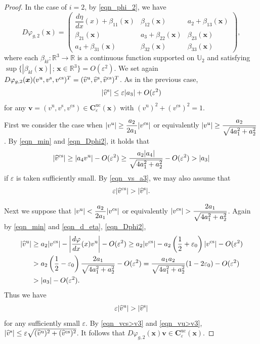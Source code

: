 \documentclass{amsart}
\theoremstyle{plain}
\theoremstyle{definition}
\theoremstyle{remark}
\numberwithin{equation}{section}
\def\bx{{\boldsymbol{x}}}
\def\bv{{\boldsymbol{v}}}
\begin{document}
\begin{proof}
In the case of $i=2$, by \eqref{eqn_phi_2}, we have 
\begin{equation}\label{eqn_Dphi2}
D\varphi_{g,2}(\bx)=\begin{pmatrix} \dfrac{d\eta}{dx}(x)+\beta_{11}(\bx)&\beta_{12}(\bx)&a_2+\beta_{13}(\bx)\\
\beta_{21}(\bx)&a_3+\beta_{22}(\bx)&\beta_{23}(\bx)\\
a_4+\beta_{31}(\bx)&\beta_{32}(\bx)&\beta_{33}(\bx)\end{pmatrix},
\end{equation}
where each $\beta_{kl}:\mathbb{R}^3\longrightarrow \mathbb{R}$ is a continuous function supported on $\mathbb{U}_2$ and satisfying  
$\sup\bigl\{|\beta_{kl}(\bx)|\, ;\, \bx \in \mathbb{R}^3\bigr\}=O(\varepsilon^2)$.
We set again $D\varphi_{g,2}(\bx)(v^{\rm u},v^{\rm s},v^{\rm cs})^T
=(\widehat{v}^{\rm u},\widehat{v}^{\rm s},\widehat{v}^{\rm cs})^T$.
As in the previous case, 
\begin{equation}\label{eqn_vs_a3}
|\widehat{v}^{\rm s}|\leq \varepsilon |a_3|+O(\varepsilon^2)
\end{equation}
for any $\bv=(v^{\mathrm{u}},v^{\mathrm{s}},v^{\mathrm{cs}})\in 
\boldsymbol{C}_{\varepsilon}^{\mathrm{uc}}(\boldsymbol{x})$ with 
$(v^{\mathrm{u}})^2+(v^{\mathrm{cs}})^2=1$.

First we consider the case when $|v^{\rm u}|\geq \dfrac{a_2}{2a_1}|v^{\rm cs}|$ or equivalently 
$|v^{\rm u}|\geq \dfrac{a_2}{\sqrt{4a_1^2+a_2^2}}$.
By \eqref{eqn_min} and \eqref{eqn_Dphi2}, it holds that 
\[
|\widehat{v}^{\rm cs}|\geq |a_4v^{\rm u}|-O(\varepsilon^2)\geq \dfrac{a_2|a_4|}{\sqrt{4a_1^2+a_2^2}}-O(\varepsilon^2)>|a_3|
\]
if $\varepsilon$ is taken sufficiently small.
By \eqref{eqn_vs_a3}, we may also assume that 
\begin{equation}\label{eqn_vcs>v3}
\varepsilon |\widehat{v}^{\rm cs}|>|\widehat{v}^{\rm s}|.
\end{equation}



Next we suppose that $|v^{\rm u}|<\dfrac{a_2}{2a_1}|v^{\rm cs}|$ or equivalently 
$|v^{\rm cs}|> \dfrac{2a_1}{\sqrt{4a_1^2+a_2^2}}$.
Again by \eqref{eqn_min} and \eqref{eqn_d_eta}, \eqref{eqn_Dphi2}, 
\begin{align*}
|\widehat{v}^{\rm u}|&\geq a_2|v^{\rm cs}|-\left|\frac{d\varphi}{dx}(x)v^{\rm u}\right|-O(\varepsilon^2)
\geq a_2|v^{\rm cs}|-a_2\left(\frac12+\varepsilon_0\right)|v^{\rm cs}|-O(\varepsilon^2)\\
&> a_2\left(\frac12-\varepsilon_0\right)\dfrac{2a_1}{\sqrt{4a_1^2+a_2^2}}-O(\varepsilon^2)
=\dfrac{a_1a_2}{\sqrt{4a_1^2+a_2^2}}(1-2\varepsilon_0)-O(\varepsilon^2)\\
&>|a_3|-O(\varepsilon^2).
\end{align*}
Thus we have 
\begin{equation}\label{eqn_vu>v3}
\varepsilon |\widehat{v}^{\rm u}|>|\widehat{v}^{\rm s}|
\end{equation}
for any sufficiently small $\varepsilon$. 
By \eqref{eqn_vcs>v3} and \eqref{eqn_vu>v3}, 
$|\widehat{v}^{\rm s}|\leq \varepsilon\sqrt{(\widehat{v}^{\rm u})^2+(\widehat{v}^{\rm cs})^2}$.
It follows that  
$D\varphi_{g,2}(\bx)\bv\in \boldsymbol{C}_{\varepsilon}^{\mathrm{uc}}(\boldsymbol{x})$.



\end{proof}
\end{document}
